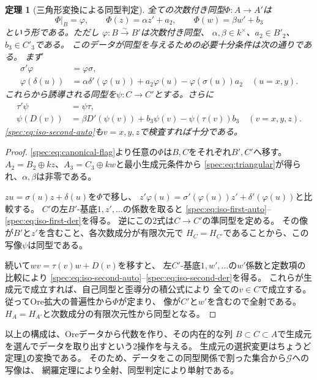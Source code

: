 \documentclass[11pt,a4paper]{ltjsarticle}
\newtheorem{theorem}{定理}[section]
\theoremstyle{definition}
\newcommand{\Gclass}{\mathcal G}
\begin{document}
\begin{theorem}[三角形変換による同型判定]\label{spec:thm:graded-isomorphisms}
全ての次数付き同型$\Phi:A\to A'$は
\begin{equation}\label{spec:eq:triangular}
\Phi|_B=\varphi,\qquad
\Phi(z)=\alpha z'+a_2,\qquad
\Phi(w)=\beta w'+b_3
\end{equation}
という形である。ただし
$\varphi:B\xrightarrow{\sim}B'$は次数付き同型、
$\alpha,\beta\in k^\times$、$a_2\in B'_2$、$b_3\in C'_3$である。
このデータが同型を与えるための必要十分条件は次の通りである。
まず
\begin{align}
\sigma'\varphi&=\varphi\sigma,\label{spec:eq:iso-first-auto}\\
\varphi(\delta(u))
&=\alpha\delta'(\varphi(u))+a_2\varphi(u)
-\varphi(\sigma(u))a_2\quad(u=x,y).\label{spec:eq:iso-first-der}
\end{align}
これらから誘導される同型を$\psi:C\to C'$とする。さらに
\begin{align}
\tau'\psi&=\psi\tau,\label{spec:eq:iso-second-auto}\\
\psi(D(v))
&=\beta D'(\psi(v))+b_3\psi(v)-\psi(\tau(v))b_3
\quad(v=x,y,z).\label{spec:eq:iso-second-der}
\end{align}
\eqref{spec:eq:iso-second-auto}も$v=x,y,z$で検査すれば十分である。
\end{theorem}
\begin{proof}
\eqref{spec:eq:canonical-flag}より任意の$\Phi$は$B,C$をそれぞれ$B',C'$へ移す。
$A_2=B_2\oplus kz$、$A_3=C_3\oplus kw$と最小生成元条件から
\eqref{spec:eq:triangular}が得られ、$\alpha,\beta$は非零である。

$zu=\sigma(u)z+\delta(u)$を$\Phi$で移し、
$z'\varphi(u)=\sigma'(\varphi(u))z'+\delta'(\varphi(u))$と比較する。
$C'$の左$B'$-基底$1,z',\ldots$の係数を取ると
\eqref{spec:eq:iso-first-auto}--\eqref{spec:eq:iso-first-der}を得る。
逆にこの2式は$C\to C'$の準同型を定める。
その像が$B'$と$z'$を含むこと、各次数成分が有限次元で
$H_C=H_{C'}$であることから、この写像$\psi$は同型である。

続いて$wv=\tau(v)w+D(v)$を移すと、
左$C'$-基底$1,w',\ldots$の$w'$係数と定数項の比較により
\eqref{spec:eq:iso-second-auto}--\eqref{spec:eq:iso-second-der}を得る。
これらが生成元で成立すれば、自己同型と歪導分の積公式により
全ての$v\in C$で成立する。従ってOre拡大の普遍性から$\Phi$が定まり、
像が$C'$と$w'$を含むので全射である。
$H_A=H_{A'}$と次数成分の有限次元性から同型となる。
\end{proof}

以上の構成は、Oreデータから代数を作り、その内在的な列
$B\subset C\subset A$で生成元を選んでデータを取り出すという2操作を与える。
生成元の選択変更はちょうど定理\ref{spec:thm:graded-isomorphisms}の変換である。
そのため、データをこの同型関係で割った集合から$\Gclass$への写像は、
網羅定理により全射、同型判定により単射である。
\end{document}
